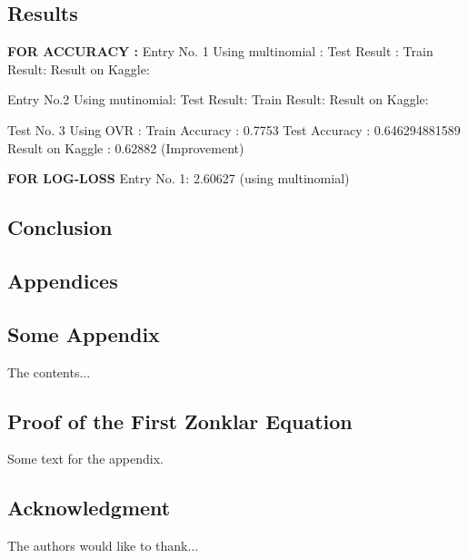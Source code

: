 \documentclass[journal]{IEEEtran}
\begin{document}
\section{Results}

\textbf{FOR ACCURACY :}
Entry No. 1 Using multinomial :
Test Result : 
Train Result:
Result on Kaggle:

Entry No.2 Using mutinomial:
Test Result:
Train Result:
Result on Kaggle:

Test No. 3 Using OVR :
Train Accuracy : 0.7753
Test Accuracy : 0.646294881589
Result on Kaggle : 0.62882 (Improvement)

\textbf{FOR LOG-LOSS}
Entry No. 1:
2.60627 (using multinomial)



\section{Conclusion}
\blindtext

\section{Appendices}
\blindtext
\begin{appendices}
	\chapter{Some Appendix}
	The contents...
\end{appendices}


\section{Proof of the First Zonklar Equation}
Some text for the appendix.
\section*{Acknowledgment}


The authors would like to thank...


\ifCLASSOPTIONcaptionsoff
  \newpage
\fi




\end{document}
